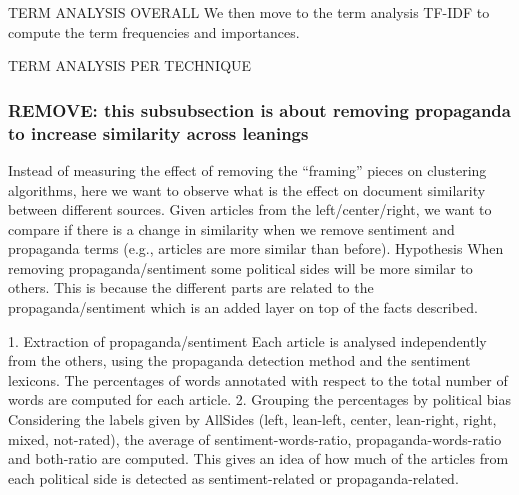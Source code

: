 TERM ANALYSIS OVERALL
We then move to the term analysis
TF-IDF to compute the term frequencies and importances.

TERM ANALYSIS PER TECHNIQUE



\subsubsection{REMOVE: this subsubsection is about removing propaganda to increase similarity across leanings}
Instead of measuring the effect of removing the “framing” pieces on clustering algorithms, here we want to observe what is the effect on document similarity between different sources.
Given articles from the left/center/right, we want to compare if there is a change in similarity when we remove sentiment and propaganda terms (e.g., articles are more similar than before).
Hypothesis
When removing propaganda/sentiment some political sides will be more similar to others. This is because the different parts are related to the propaganda/sentiment which is an added layer on top of the facts described.

1. Extraction of propaganda/sentiment
Each article is analysed independently from the others, using the propaganda detection method and the sentiment lexicons.
The percentages of words annotated with respect to the total number of words are computed for each article.
2. Grouping the percentages by political bias
Considering the labels given by AllSides (left, lean-left, center, lean-right, right, mixed, not-rated), the average of sentiment-words-ratio, propaganda-words-ratio and both-ratio are computed. This gives an idea of how much of the articles from each political side is detected as sentiment-related or propaganda-related.


